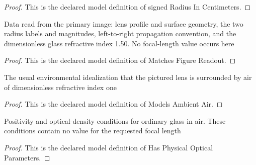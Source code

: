 \begin{proof}
  This is the declared model definition of signed Radius In Centimeters.
\end{proof}
\begin{definition}
  \label{def:physics:phyx-mini-0056:phyxminiproblems-problemphyxmini0056-matchesfigurereadout}
  Data read from the primary image: lens profile and surface geometry, the two radius labels and magnitudes, left-to-right propagation convention, and the dimensionless glass refractive index 1.50. No focal-length value occurs here
\end{definition}
\begin{proof}
  This is the declared model definition of Matches Figure Readout.
\end{proof}
\begin{definition}
  \label{def:physics:phyx-mini-0056:phyxminiproblems-problemphyxmini0056-modelsambientair}
  The usual environmental idealization that the pictured lens is surrounded by air of dimensionless refractive index one
\end{definition}
\begin{proof}
  This is the declared model definition of Models Ambient Air.
\end{proof}
\begin{definition}
  \label{def:physics:phyx-mini-0056:phyxminiproblems-problemphyxmini0056-hasphysicalopticalparameters}
  Positivity and optical-density conditions for ordinary glass in air. These conditions contain no value for the requested focal length
\end{definition}
\begin{proof}
  This is the declared model definition of Has Physical Optical Parameters.
\end{proof}
